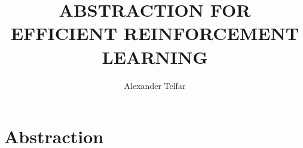 \documentclass[12pt, a4paper, twoside, openright]{book}
\begin{document}
\frontmatter


\title{ABSTRACTION FOR EFFICIENT REINFORCEMENT LEARNING}
\author{Alexander Telfar}

\subject{Computer Science}

\mscthesisonly







\maketitle



\tableofcontents



\mainmatter






\chapter{Abstraction}\label{C:bin}













% 


\appendix

\end{document}
